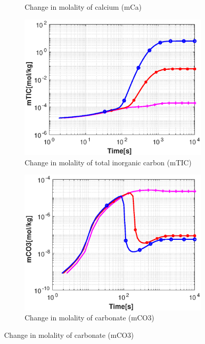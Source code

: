 \begin{figure}[!h]
\begin{subfigure}{.5\linewidth}
        \caption{Change in molality of calcium (mCa)}
        \label{fig:CO2mCa}
    \end{subfigure}%
        \hfill
    \begin{subfigure}{.5\linewidth}
            \centering
        \includegraphics[width=\textwidth]{PICTURES/with_CO2_mTIC.eps}
        \caption{Change in molality of total inorganic carbon (mTIC)}
        \label{fig:CO2mTIC}
    \end{subfigure}%
    \hfill
    \begin{subfigure}{.5\linewidth}
            \centering
        \includegraphics[width=\textwidth]{PICTURES/with_CO2_mCO3.eps}
        \caption{Change in molality of carbonate (mCO3)}

\end{subfigure}
\end{figure}
